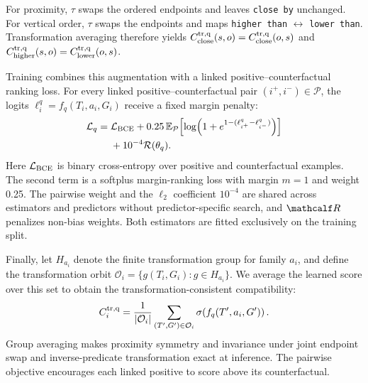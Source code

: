 For proximity, $\tau$ swaps the ordered endpoints and leaves \texttt{close by} unchanged. For vertical order, $\tau$ swaps the endpoints and maps \texttt{higher than} $\leftrightarrow$ \texttt{lower than}. Transformation averaging therefore yields 
$C^{\rm tr,q}_{\rm close}(s,o)=C^{\rm tr,q}_{\rm close}(o,s)$ and
$C^{\rm tr,q}_{\rm higher}(s,o)=C^{\rm tr,q}_{\rm lower}(o,s)$.

Training combines this augmentation with a linked positive--counterfactual ranking loss. For every linked positive--counterfactual pair $(i^+,i^-)\in\mathcal P$, the logits $\ell_i^q=f_q(T_i,a_i,G_i)$ receive a fixed margin penalty:
\begin{equation}
\begin{aligned}
\mathcal L_q={}&\mathcal L_{\rm BCE}
+0.25\,\mathbb E_{\mathcal P}\!
 \left[\log\!\left(1+e^{1-(\ell^q_{i^+}-\ell^q_{i^-})}\right)\right]\\
&+10^{-4}\mathcal R(\theta_q).
\end{aligned}
\end{equation}
Here $\mathcal L_{\rm BCE}$ is binary cross-entropy over positive and counterfactual examples. The second term is a softplus margin-ranking loss with margin $m=1$ and weight 0.25. The pairwise weight and the $\ell_2$ coefficient $10^{-4}$ are shared across estimators and predictors without predictor-specific search, and $\mathcalf R$ penalizes non-bias weights.  
Both estimators are fitted exclusively on the training split. 

Finally, let $H_{a_i}$ denote the finite transformation group for family $a_i$, and define the transformation orbit $\mathcal O_i=\{g(T_i,G_i):g\in H_{a_i}\}$. We average the learned score over this set to obtain the transformation-consistent compatibility:
\begin{equation}
C_i^{\rm tr,q}=\frac{1}{|\mathcal O_i|}
\sum_{(T',G')\in\mathcal O_i} \sigma\!\left(f_q(T',a_i,G')\right).
\label{eq:algebra-projection}
\end{equation}
Group averaging makes proximity symmetry and invariance under joint endpoint swap and inverse-predicate transformation exact at inference. The pairwise objective encourages each linked positive to score above its counterfactual.

